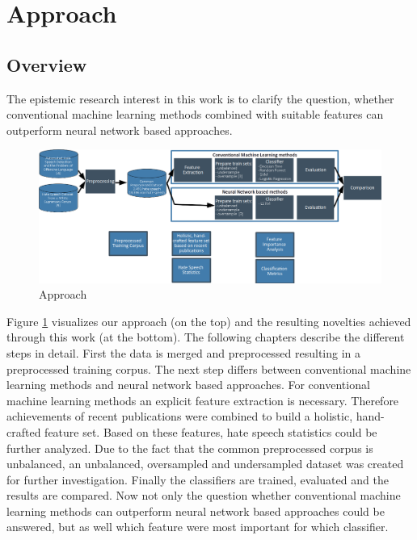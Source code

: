 \section{Approach} 
\label{approach}

\subsection{Overview} 
\label{ch:approach0}

The epistemic research interest in this work is to clarify the question, whether conventional machine learning methods combined with suitable features can outperform neural network based approaches.

\begin{figure}[ht]
	\centering
	\includegraphics[width=1.0\linewidth]{figures/pipeline.png}
	\caption{Approach}
	\label{fig:overall_pipeline}
\end{figure}

Figure \ref{fig:overall_pipeline} visualizes our approach (on the top) and the resulting novelties achieved through this work (at the bottom). The following chapters describe the different steps in detail. First the data is merged and preprocessed resulting in a preprocessed training corpus. The next step differs between conventional machine learning methods and neural network based approaches. For conventional machine learning methods an explicit feature extraction is necessary. Therefore achievements of recent publications were combined to build a holistic, hand-crafted feature set. Based on these features, hate speech statistics could be further analyzed. Due to the fact that the common preprocessed corpus is unbalanced, an unbalanced, oversampled and under\-sampled dataset was created for further investigation. Finally the classifiers are trained, evaluated and the results are compared. Now not only the question whether conventional machine learning methods can outperform neural net\-work based approaches could be answered, but as well which feature were most important for which classifier.

